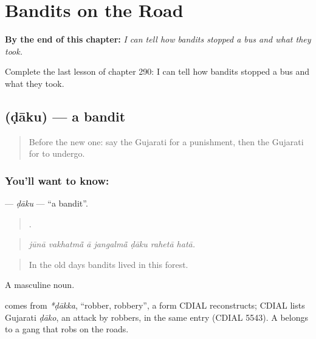 
\chapter{Bandits on the Road}
\label{ch:gu-bandits-on-the-road}

\begin{chapteropening}
\textbf{By the end of this chapter:} \emph{I can tell how bandits stopped a bus and what they took.}

Complete the last lesson of chapter 290: I can tell how bandits stopped a bus and what they took.
\end{chapteropening}

\section[\texorpdfstring{\gu{ડાકુ} (ḍāku)}{ડાકુ (ḍāku)}]{ (ḍāku) — a bandit}

\label{lesson:GU-C290-daku}



\begin{quote}
Before the new one: say the Gujarati for a punishment, then the Gujarati for to undergo.
\end{quote}

\subsection*{You'll want to know: }
\textbf{} — \emph{ḍāku} — \textquotedblleft{}a bandit\textquotedblright{}.

\begin{quote}
      .
\end{quote}

\begin{quote}
\emph{jūnā vakhatmā̃ ā jangalmā̃ ḍāku rahetā hatā.}
\end{quote}

\begin{quote}
In the old days bandits lived in this forest.
\end{quote}

A masculine noun.

\begin{cousinweb}
comes from \emph{*ḍākka}, \textquotedblleft{}robber, robbery\textquotedblright{}, a form CDIAL reconstructs; CDIAL lists Gujarati \emph{ḍāko}, an attack by robbers, in the same entry (CDIAL 5543). A \textbf{} belongs to a gang that robs on the roads.
\end{cousinweb}

